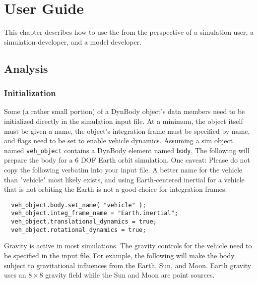 \chapter{User Guide}\label{ch:user}
This chapter describes how to use the \ModelDesc from the
perspective of a simulation user, a simulation developer,
and a model developer.

\section{Analysis}

\subsection{Initialization}
Some (a rather small portion) of a DynBody object's data members need to
be initialized directly in the simulation input file. At a minimum,
the object itself must be given a name,
the object's integration frame must be specified by name, and
flags need to be set to enable vehicle dynamics.
Assuming a sim object
named \verb+veh_object+ contains a DynBody element named \verb+body+,
The following will prepare the body for a 6 DOF Earth orbit simulation.
One caveat: Please do not copy the following verbatim into your input file.
A better name for the vehicle than "vehicle" most likely exists,
and using Earth-centered inertial for a vehicle that is not orbiting the
Earth is not a good choice for integration frames.

\begin{verbatim}
  veh_object.body.set_name( "vehicle" );
  veh_object.integ_frame_name = "Earth.inertial";
  veh_object.translational_dynamics = true;
  veh_object.rotational_dynamics = true;
\end{verbatim}

Gravity is active in most simulations. The gravity controls for the
vehicle need to be specified in the input file. For example, the following
will make the body subject to gravitational influences from the Earth, Sun,
and Moon. Earth gravity uses an $8\times8$ gravity field while the Sun
and Moon are point sources.

